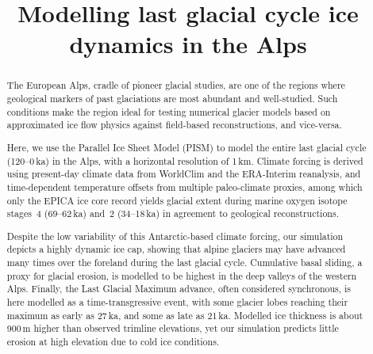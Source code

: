 \documentclass[tc, manuscript]{copernicus}
\title{Modelling last glacial cycle ice dynamics in the Alps}
\affil[1]{Laboratory of Hydraulics, Hydrology and Glaciology,
          ETH Zürich, Switzerland}
\affil[2]{Institute of Earth and Environmental Sciences,
          University of Freiburg, Germany}
\begin{document}


\maketitle

\begin{abstract}

    The European Alps, cradle of pioneer glacial studies, are one of the
    regions where geological markers of past glaciations are most abundant and
    well-studied. Such conditions make the region ideal for testing numerical
    glacier models based on approximated ice flow physics against field-based
    reconstructions, and vice-versa.

    Here, we use the Parallel Ice Sheet Model (PISM) to model the entire last
    glacial cycle (120--0\,ka) in the Alps, with a horizontal resolution of
    1\,km. Climate forcing is derived using present-day climate data from
    WorldClim and the ERA-Interim reanalysis, and time-dependent temperature
    offsets from multiple paleo-climate proxies, among which only the EPICA ice
    core record yields glacial extent during marine oxygen isotope stages~4
    (69--62\,ka) and~2 (34--18\,ka) in agreement to geological reconstructions.

    Despite the low variability of this Antarctic-based climate forcing, our
    simulation depicts a highly dynamic ice cap, showing that alpine glaciers
    may have advanced many times over the foreland during the last glacial
    cycle. Cumulative basal sliding, a proxy for glacial erosion, is modelled
    to be highest in the deep valleys of the western Alps. Finally, the Last
    Glacial Maximum advance, often considered synchronous, is here modelled as
    a time-transgressive event, with some glacier lobes reaching their maximum
    as early as 27\,ka, and some as late as 21\,ka. Modelled ice thickness is
    about 900\,m higher than observed trimline elevations, yet our simulation
    predicts little erosion at high elevation due to cold ice conditions.

\end{abstract}



\introduction
\label{sec:intro}
\end{document}
